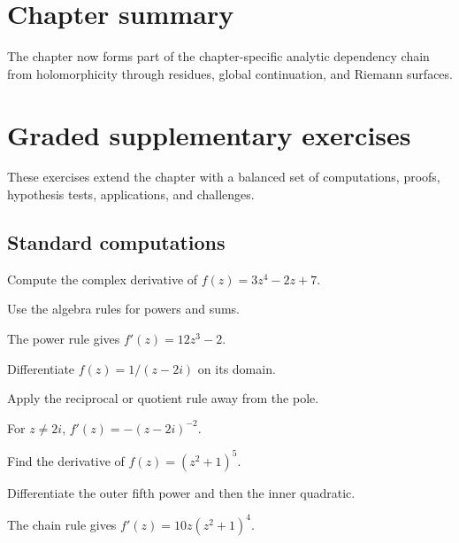 \section*{Chapter summary}
The chapter now forms part of the chapter-specific analytic dependency chain from holomorphicity through residues, global continuation, and Riemann surfaces.
\section{Graded supplementary exercises}
These exercises extend the chapter with a balanced set of computations, proofs, hypothesis tests, applications, and challenges.

\subsection*{Standard computations}

\begin{exercise}\label{exr:iv01-expand-01}
Compute the complex derivative of \(f(z)=3z^4-2z+7\).
\end{exercise}
\begin{hint}
Use the algebra rules for powers and sums.
\end{hint}
\begin{solution}
The power rule gives \(f'(z)=12z^3-2\).
\end{solution}

\begin{exercise}\label{exr:iv01-expand-02}
Differentiate \(f(z)=1/(z-2i)\) on its domain.
\end{exercise}
\begin{hint}
Apply the reciprocal or quotient rule away from the pole.
\end{hint}
\begin{solution}
For \(z\ne2i\), \(f'(z)=-(z-2i)^{-2}\).
\end{solution}

\begin{exercise}\label{exr:iv01-expand-03}
Find the derivative of \(f(z)=(z^2+1)^5\).
\end{exercise}
\begin{hint}
Differentiate the outer fifth power and then the inner quadratic.
\end{hint}
\begin{solution}
The chain rule gives \(f'(z)=10z(z^2+1)^4\).
\end{solution}

